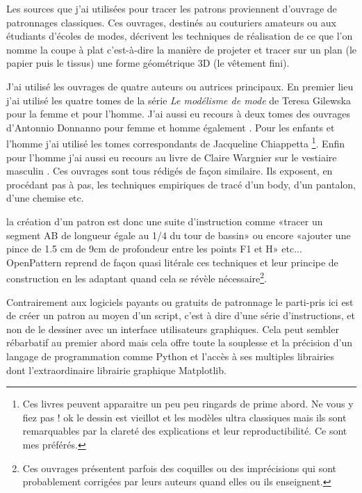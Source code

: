 \documentclass[10pt,a4paper,twoside]{report}
\begin{document}
Les sources que j'ai utilisées pour tracer les patrons proviennent d'ouvrage de patronnages classiques. Ces ouvrages, destinés au couturiers amateurs ou aux étudiants d'écoles de modes, décrivent les techniques de réalisation de ce que l'on nomme la coupe à plat c'est-à-dire  la manière de projeter et tracer sur un plan (le papier puis le tissus) une forme géométrique 3D (le vêtement fini).

J'ai utilisé les ouvrages de quatre auteurs ou autrices principaux.
En premier lieu j'ai utilisé les quatre tomes de la série \textit{Le modélisme de mode} de Teresa Gilewska pour la femme et pour l'homme\cite{Gilewska1,Gilewska2,Gilewska4,Gilewska5}. J'ai aussi eu recours à deux tomes des ouvrages d'Antonnio Donnanno pour femme et homme également \cite{Donnanno2005,Donnanno2016}. Pour les enfants et l'homme j'ai utilisé les tomes correspondants de Jacqueline Chiappetta  \cite{Chiappetta1998,Chiappetta2000}\footnote{Ces livres peuvent apparaitre un peu peu ringards de prime abord. Ne vous y fiez pas ! ok le dessin est vieillot et les modèles ultra classiques mais ils sont remarquables par la clareté des explications et leur reproductibilité. Ce sont mes préférés.}. Enfin pour l'homme j'ai aussi eu recours au livre de  Claire Wargnier sur le vestiaire masculin \cite{wargnier2012}. Ces ouvrages sont tous rédigés de façon similaire. Ils exposent, en procédant pas à pas, les techniques empiriques de tracé d'un body, d'un pantalon, d'une chemise etc.

la création d'un patron est donc une suite d'instruction comme «tracer un segment AB de longueur égale au 1/4 du tour de bassin» ou encore «ajouter une pince de 1.5 cm de 9cm de profondeur entre les points F1 et H» etc...
OpenPattern reprend de façon quasi litérale ces techniques et leur principe de construction en les adaptant quand cela se révèle nécessaire\footnote{Ces ouvrages présentent parfois des coquilles ou des imprécisions qui  sont probablement corrigées par leurs auteurs quand elles ou ils enseignent.}.

Contrairement aux logiciels payants ou gratuits de patronnage le parti-pris ici est de créer  un patron au moyen d'un script, c'est à dire d'une série d'instructions, et non de le dessiner avec un interface utilisateurs graphiques. Cela peut sembler rébarbatif au premier abord mais cela offre toute la souplesse et la précision d'un langage de programmation comme Python et l'accès à ses multiples librairies dont l'extraordinaire librairie graphique Matplotlib.
\end{document}
